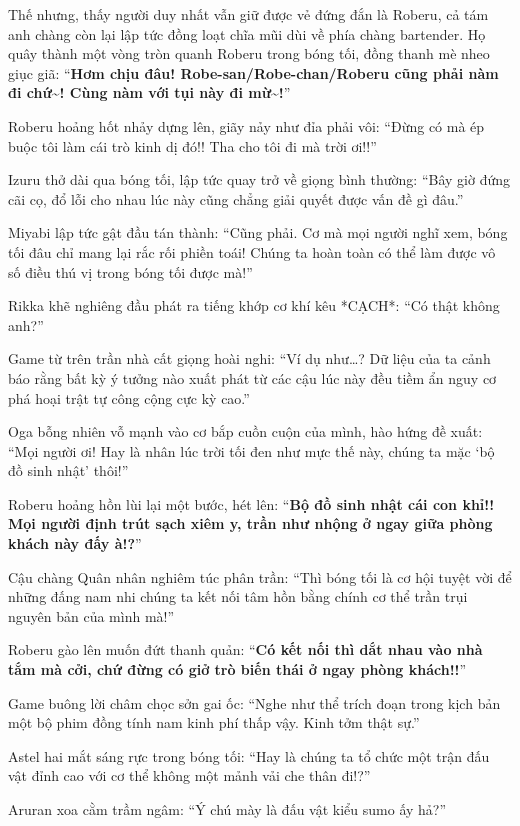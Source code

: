 \documentclass[../main.tex]{subfiles}
\begin{document}
Thế nhưng, thấy người duy nhất vẫn giữ được vẻ đứng đắn là Roberu, cả tám anh chàng còn lại lập tức đồng loạt chĩa mũi dùi về phía chàng bartender. Họ quây thành một vòng tròn quanh Roberu trong bóng tối, đồng thanh mè nheo giục giã: ``\textbf{Hơm chịu đâu! Robe-san/Robe-chan/Roberu cũng phải nàm đi chứ\~{}! Cùng nàm với tụi này đi mừ\~{}!}''

Roberu hoảng hốt nhảy dựng lên, giãy nảy như đỉa phải vôi: ``Đừng có mà ép buộc tôi làm cái trò kinh dị đó!! Tha cho tôi đi mà trời ơi!!''

Izuru thở dài qua bóng tối, lập tức quay trở về giọng bình thường: ``Bây giờ đứng cãi cọ, đổ lỗi cho nhau lúc này cũng chẳng giải quyết được vấn đề gì đâu.''

Miyabi lập tức gật đầu tán thành: ``Cũng phải. Cơ mà mọi người nghĩ xem, bóng tối đâu chỉ mang lại rắc rối phiền toái! Chúng ta hoàn toàn có thể làm được vô số điều thú vị trong bóng tối được mà!''

Rikka khẽ nghiêng đầu phát ra tiếng khớp cơ khí kêu *CẠCH*: ``Có thật không anh?''

Game từ trên trần nhà cất giọng hoài nghi: ``Ví dụ như\dots? Dữ liệu của ta cảnh báo rằng bất kỳ ý tưởng nào xuất phát từ các cậu lúc này đều tiềm ẩn nguy cơ phá hoại trật tự công cộng cực kỳ cao.''

Oga bỗng nhiên vỗ mạnh vào cơ bắp cuồn cuộn của mình, hào hứng đề xuất: ``Mọi người ơi! Hay là nhân lúc trời tối đen như mực thế này, chúng ta mặc `bộ đồ sinh nhật' thôi!''

Roberu hoảng hồn lùi lại một bước, hét lên: ``\textbf{Bộ đồ sinh nhật cái con khỉ!! Mọi người định trút sạch xiêm y, trần như nhộng ở ngay giữa phòng khách này đấy à!?}''

Cậu chàng Quân nhân nghiêm túc phân trần: ``Thì bóng tối là cơ hội tuyệt vời để những đấng nam nhi chúng ta kết nối tâm hồn bằng chính cơ thể trần trụi nguyên bản của mình mà!''

Roberu gào lên muốn đứt thanh quản: ``\textbf{Có kết nối thì dắt nhau vào nhà tắm mà cởi, chứ đừng có giở trò biến thái ở ngay phòng khách!!}''

Game buông lời châm chọc sởn gai ốc: ``Nghe như thể trích đoạn trong kịch bản một bộ phim đồng tính nam kinh phí thấp vậy. Kinh tởm thật sự.''

Astel hai mắt sáng rực trong bóng tối: ``Hay là chúng ta tổ chức một trận đấu vật đỉnh cao với cơ thể không một mảnh vải che thân đi!?''

Aruran xoa cằm trầm ngâm: ``Ý chú mày là đấu vật kiểu sumo ấy hả?''
\end{document}
